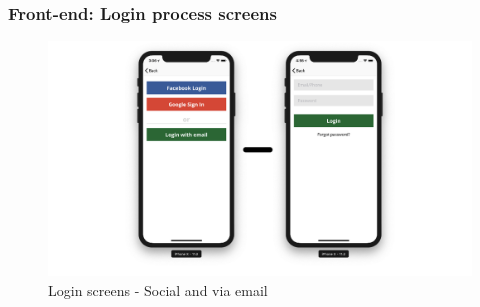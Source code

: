 \begin{frame}
\frametitle{Front-end: Login process screens}
    \begin{figure}[H]
            \centering
            \includegraphics[width=0.95\linewidth]{final/figures/login.png}
            \caption{Login screens - Social and via email}
    \end{figure}
 
\end{frame}

